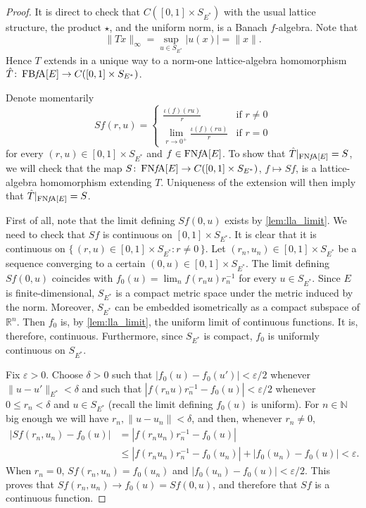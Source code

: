 \documentclass{memo-l}
\theoremstyle{definition}
\theoremstyle{remark}
\numberwithin{section}{chapter}
\numberwithin{equation}{chapter}
\newcommand\N{\ensuremath{\mathbb{N}}}
\newcommand\R{\ensuremath{\mathbb{R}}}
\newcommand{\falg}{$f\!$-algebra}
\newcommand{\FNFA}[1]{\operatorname{FN{\it f}\!A}[#1]}
\newcommand{\FBFA}[1]{\operatorname{FB{\it f}\!A}[#1]}
\begin{document}
\begin{proof}
    It is direct to check that $C([0,1]\times S_{E^{*}})$
    with the usual lattice structure, the product $\star$, and the
    uniform norm, is a Banach \falg. Note that
    \[
    \|Tx\|_\infty =\sup_{u \in S_{E^{*}}} |u(x)|=\|x\|.
    \]
    Hence $T$ extends in a unique way to a norm-one lattice-algebra
    homomorphism $\hat{T}\colon \FBFA E\to C([0,1]\times S_{E^{*}})$.

    Denote momentarily
    \[
    Sf(r,u)=
    \begin{cases}
        \displaystyle\frac{\iota (f)(ru)}{r}&\text{if }r\neq 0\\
        \displaystyle\lim_{r\to 0^{+}}\frac{\iota (f)(ru)}{r}&\text{if }r=0
    \end{cases}
    \]
    for every $(r,u) \in [0,1]\times S_{E^{*}}$ and $f \in \FNFA E$.
    To show that $\hat{T}|_{\FNFA E}=S$, we will check that the map
    $S\colon \FNFA E\to C([0,1]\times S_{E^{*}})$, $f\mapsto Sf$, is a
    lattice-algebra homomorphism extending $T$. Uniqueness of the
    extension will then imply that $\hat{T}|_{\FNFA E}=S$.

    First of all, note that the limit defining $Sf(0,u)$ exists by
    \cref{lem:lla_limit}. We need to check that $Sf$ is continuous on
    $[0,1]\times S_{E^{*}}$. It is clear that it
    is continuous on $\{\,(r,u)\in [0,1]\times S_{E^{*}}:r\neq 0\,\}$.
    Let $(r_n,u_n)\in [0,1]\times S_{E^{*}}$ be a sequence converging
    to a certain $(0,u) \in [0,1]\times S_{E^{*}}$. The limit
    defining $Sf(0,u)$ coincides with
    $f_0(u)=\lim_{n}f(r_nu)r_n^{-1}$ for every $u \in
    S_{E^{*}}$. Since $E$ is finite-dimensional,
    $S_{E^{*}}$ is a compact metric space under the metric induced by
    the norm. Moreover, $S_{E^{*}}$ can be embedded isometrically as a compact subspace of $\R^{n}$.
    Then $f_0$ is, by \cref{lem:lla_limit}, the uniform limit of
    continuous functions. It is, therefore, continuous. Furthermore,
    since $S_{E^{*}}$ is compact, $f_0$ is uniformly continuous on
    $S_{E^{*}}$.

    Fix $\varepsilon >0$. Choose $\delta >0$ such that
    $|f_0(u)-f_0(u')|<\varepsilon/2$ whenever $\|u-u'\|_{E^{*}}<\delta $ and
    such that $|f(r_nu)r_n^{-1}-f_0(u)|<\varepsilon/2$ whenever $0\le
    r_n<\delta $ and $u \in S_{E^{*}}$ (recall the limit
    defining $f_0(u)$ is uniform). For $n \in \N$
    big enough we will have $r_n,\|u-u_n\|<\delta $, and then,
    whenever $r_n\neq 0$,
    \begin{align*}
        |Sf(r_n,u_n)-f_0(u)|&=|f(r_n u_n)r_n^{-1} - f_0(u)|\\&\le |f(r_n u_n)r_n^{-1} -
    f_0(u_n)|+|f_0(u_n)-f_0(u)|<\varepsilon.
    \end{align*}
    When $r_n=0$, $Sf(r_n,u_n)=f_0(u_n)$ and
    $|f_0(u_n)-f_0(u)|<\varepsilon /2$.
    This proves that $Sf(r_n,u_n)\to f_0(u)=Sf(0,u)$, and therefore that $Sf$
    is a continuous function.


\end{proof}
\end{document}
